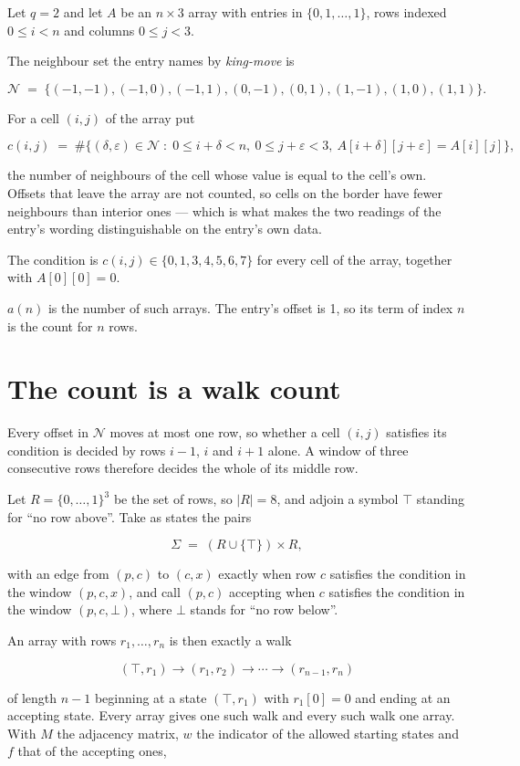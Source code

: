 \documentclass[11pt]{article}
\theoremstyle{definition}
\begin{document}
Let $q = 2$ and let $A$ be an $n \times 3$ array with entries in $\{0,1,\dots,1\}$, rows indexed $0 \le i < n$ and columns $0 \le j < 3$.

The neighbour set the entry names by {\itshape king-move} is

\[\mathcal{N} \;=\; \{(-1,-1), (-1,0), (-1,1), (0,-1), (0,1), (1,-1), (1,0), (1,1)\}.\]

For a cell $(i,j)$ of the array put

\[c(i,j) \;=\; \#\bigl\{(\delta,\varepsilon)\in\mathcal{N} \;:\; 0\le i+\delta<n,\ 0\le j+\varepsilon<3,\ A[i+\delta][j+\varepsilon] = A[i][j]\bigr\},\]

the number of neighbours of the cell whose value is equal to the cell's own. Offsets that leave the array are not counted, so cells on the border have fewer neighbours than interior ones --- which is what makes the two readings of the entry's wording distinguishable on the entry's own data.

The condition is $c(i,j) \in \{0, 1, 3, 4, 5, 6, 7\}$ for every cell of the array, together with $A[0][0]=0$.

$a(n)$ is the number of such arrays. The entry's offset is 1, so its term of index $n$ is the count for $n$ rows.

\section{The count is a walk count}

Every offset in $\mathcal{N}$ moves at most one row, so whether a cell $(i,j)$ satisfies its condition is decided by rows $i-1$, $i$ and $i+1$ alone. A window of three consecutive rows therefore decides the whole of its middle row.

Let $R = \{0,\dots,1\}^{3}$ be the set of rows, so $|R| = 8$, and adjoin a symbol $\top$ standing for ``no row above''. Take as states the pairs

\[\Sigma \;=\; (R \cup \{\top\}) \times R,\]

with an edge from $(p,c)$ to $(c,x)$ exactly when row $c$ satisfies the condition in the window $(p,c,x)$, and call $(p,c)$ accepting when $c$ satisfies the condition in the window $(p,c,\bot)$, where $\bot$ stands for ``no row below''.

An array with rows $r_1,\dots,r_n$ is then exactly a walk

\[(\top,r_1) \to (r_1,r_2) \to \cdots \to (r_{n-1},r_n)\]

of length $n-1$ beginning at a state $(\top,r_1)$ with $r_1[0]=0$ and ending at an accepting state. Every array gives one such walk and every such walk one array. With $M$ the adjacency matrix, $w$ the indicator of the allowed starting states and $f$ that of the accepting ones,
\end{document}
